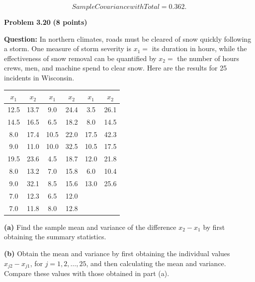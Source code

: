 \documentclass{article}
\begin{document}
$$
\boxed{Sample Covariance with Total=0.362}.
$$


\newpage

\noindent
{\Large \textbf{Problem 3.20}}
\hfill
{\large \textbf{(8 points)}}

\vspace{0.3cm}

\noindent
\textbf{Question:} In northern climates, roads must be cleared of snow
quickly following a storm. One measure of storm severity is
$x_1=$ its duration in hours, while the effectiveness of snow removal
can be quantified by $x_2=$ the number of hours crews, men, and
machine spend to clear snow. Here are the results for 25 incidents
in Wisconsin.

\vspace{0.2cm}

\begin{center}
\begin{tabular}{c|c|c|c|c|c}
$x_1$ & $x_2$ & $x_1$ & $x_2$ & $x_1$ & $x_2$\\
\hline
12.5&13.7&9.0&24.4&3.5&26.1\\
14.5&16.5&6.5&18.2&8.0&14.5\\
8.0&17.4&10.5&22.0&17.5&42.3\\
9.0&11.0&10.0&32.5&10.5&17.5\\
19.5&23.6&4.5&18.7&12.0&21.8\\
8.0&13.2&7.0&15.8&6.0&10.4\\
9.0&32.1&8.5&15.6&13.0&25.6\\
7.0&12.3&6.5&12.0&&\\
7.0&11.8&8.0&12.8&&
\end{tabular}
\end{center}

\vspace{0.2cm}

\noindent
\textbf{(a)} Find the sample mean and variance of the difference
$x_2-x_1$ by first obtaining the summary statistics.

\vspace{0.2cm}

\noindent
\textbf{(b)} Obtain the mean and variance by first obtaining the
individual values $x_{j2}-x_{j1}$, for $j=1,2,\ldots,25$, and then
calculating the mean and variance. Compare these values with those
obtained in part (a).
\end{document}
